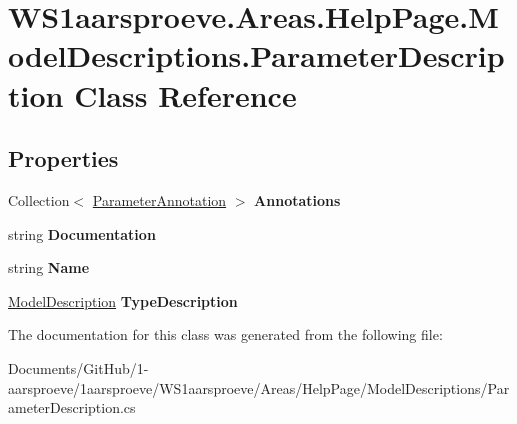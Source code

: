 \hypertarget{class_w_s1aarsproeve_1_1_areas_1_1_help_page_1_1_model_descriptions_1_1_parameter_description}{}\section{W\+S1aarsproeve.\+Areas.\+Help\+Page.\+Model\+Descriptions.\+Parameter\+Description Class Reference}
\label{class_w_s1aarsproeve_1_1_areas_1_1_help_page_1_1_model_descriptions_1_1_parameter_description}
\subsection*{Properties}
\begin{DoxyCompactItemize}
\item 
\hypertarget{class_w_s1aarsproeve_1_1_areas_1_1_help_page_1_1_model_descriptions_1_1_parameter_description_a9e9c9bef0f209d9e8a10bff4e85a79b8}{}Collection$<$ \hyperlink{class_w_s1aarsproeve_1_1_areas_1_1_help_page_1_1_model_descriptions_1_1_parameter_annotation}{Parameter\+Annotation} $>$ {\bfseries Annotations}\label{class_w_s1aarsproeve_1_1_areas_1_1_help_page_1_1_model_descriptions_1_1_parameter_description_a9e9c9bef0f209d9e8a10bff4e85a79b8}

\item 
\hypertarget{class_w_s1aarsproeve_1_1_areas_1_1_help_page_1_1_model_descriptions_1_1_parameter_description_aa45a27742c0ddb24d90391b263c4e5f6}{}string {\bfseries Documentation}\label{class_w_s1aarsproeve_1_1_areas_1_1_help_page_1_1_model_descriptions_1_1_parameter_description_aa45a27742c0ddb24d90391b263c4e5f6}

\item 
\hypertarget{class_w_s1aarsproeve_1_1_areas_1_1_help_page_1_1_model_descriptions_1_1_parameter_description_abb659a2959968e55318c78dc3fa64a7f}{}string {\bfseries Name}\label{class_w_s1aarsproeve_1_1_areas_1_1_help_page_1_1_model_descriptions_1_1_parameter_description_abb659a2959968e55318c78dc3fa64a7f}

\item 
\hypertarget{class_w_s1aarsproeve_1_1_areas_1_1_help_page_1_1_model_descriptions_1_1_parameter_description_a98e47755589900ff168a0e957337c285}{}\hyperlink{class_w_s1aarsproeve_1_1_areas_1_1_help_page_1_1_model_descriptions_1_1_model_description}{Model\+Description} {\bfseries Type\+Description}\label{class_w_s1aarsproeve_1_1_areas_1_1_help_page_1_1_model_descriptions_1_1_parameter_description_a98e47755589900ff168a0e957337c285}

\end{DoxyCompactItemize}


The documentation for this class was generated from the following file\+:\begin{DoxyCompactItemize}
\item 
Documents/\+Git\+Hub/1-\/aarsproeve/1aarsproeve/\+W\+S1aarsproeve/\+Areas/\+Help\+Page/\+Model\+Descriptions/Parameter\+Description.\+cs\end{DoxyCompactItemize}
